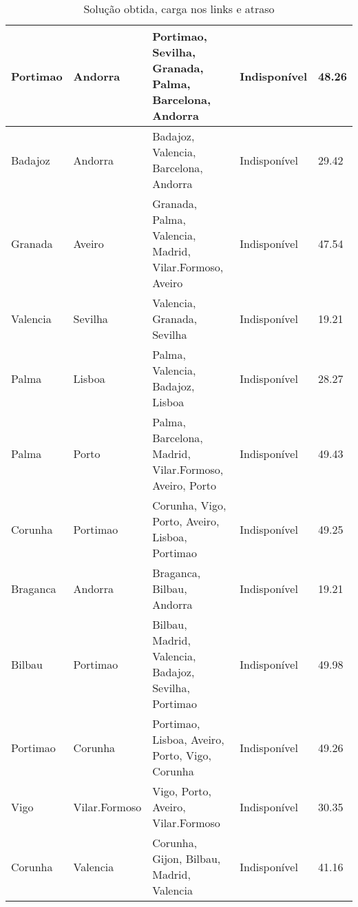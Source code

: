 \begin{table}[!htb]
{\begin{tabular}{|l|l|l|l|l|}
Portimao & Andorra & Portimao, Sevilha, Granada, Palma, Barcelona, Andorra & Indisponível & 48.26 \\ \hline
Badajoz & Andorra & Badajoz, Valencia, Barcelona, Andorra & Indisponível & 29.42 \\ \hline
Granada & Aveiro & Granada, Palma, Valencia, Madrid, Vilar.Formoso, Aveiro & Indisponível & 47.54 \\ \hline
Valencia & Sevilha & Valencia, Granada, Sevilha & Indisponível & 19.21 \\ \hline
Palma & Lisboa & Palma, Valencia, Badajoz, Lisboa & Indisponível & 28.27 \\ \hline
Palma & Porto & Palma, Barcelona, Madrid, Vilar.Formoso, Aveiro, Porto & Indisponível & 49.43 \\ \hline
Corunha & Portimao & Corunha, Vigo, Porto, Aveiro, Lisboa, Portimao & Indisponível & 49.25 \\ \hline
Braganca & Andorra & Braganca, Bilbau, Andorra & Indisponível & 19.21 \\ \hline
Bilbau & Portimao & Bilbau, Madrid, Valencia, Badajoz, Sevilha, Portimao & Indisponível & 49.98 \\ \hline
Portimao & Corunha & Portimao, Lisboa, Aveiro, Porto, Vigo, Corunha & Indisponível & 49.26 \\ \hline
Vigo & Vilar.Formoso & Vigo, Porto, Aveiro, Vilar.Formoso & Indisponível & 30.35 \\ \hline
Corunha & Valencia & Corunha, Gijon, Bilbau, Madrid, Valencia & Indisponível & 41.16 \\ \hline
\end{tabular}}
\caption[]{Solução obtida, carga nos links e atraso}
\end{table}

